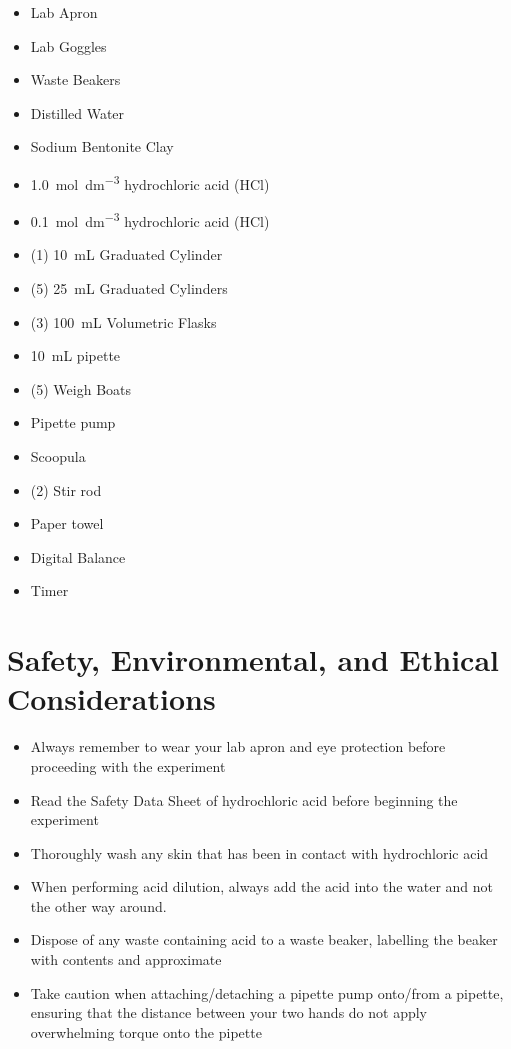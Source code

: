 \documentclass[11pt, letterpaper]{article}
\begin{document}
\begin{multicols}{2}

    \begin{itemize}
        \item Lab Apron
        \item Lab Goggles
        \item Waste Beakers
        \item Distilled Water
        \item Sodium Bentonite Clay
        \item \SI{1.0}{mol.dm^{-3}} hydrochloric acid (HCl)
        \item \SI{0.1}{mol.dm^{-3}} hydrochloric acid (HCl)
        \item (1) \SI{10}{mL} Graduated Cylinder
        \item (5) \SI{25}{mL} Graduated Cylinders
        \item (3) \SI{100}{mL} Volumetric Flasks
        \item \SI{10}{mL} pipette
        \item (5) Weigh Boats
        \item Pipette pump
        \item Scoopula
        \item (2) Stir rod
        \item Paper towel
        \item Digital Balance
        \item Timer
    \end{itemize}

\end{multicols}

\section{Safety, Environmental, and Ethical Considerations}

\begin{itemize}
    \item Always remember to wear your lab apron and eye protection before proceeding with the experiment
    \item Read the Safety Data Sheet of hydrochloric acid before beginning the experiment
    \item Thoroughly wash any skin that has been in contact with hydrochloric acid
    \item When performing acid dilution, always add the acid into the water and not the other way around.
    \item Dispose of any waste containing acid to a waste beaker, labelling the beaker with contents and approximate \ce{[H+]}
    \item Take caution when attaching/detaching a pipette pump onto/from a pipette, ensuring that the distance between your two hands do not apply overwhelming torque onto the pipette
\end{itemize}
\end{document}
